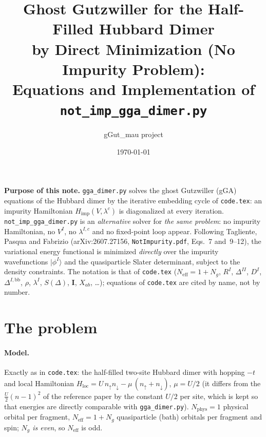 \documentclass[11pt]{article}
\title{Ghost Gutzwiller for the Half-Filled Hubbard Dimer\\
by Direct Minimization (No Impurity Problem):\\
Equations and Implementation of \texttt{not\_imp\_gga\_dimer.py}}
\author{gGut\_mau project}
\date{\today}
\newcommand{\Neff}{N_{\mathrm{eff}}}
\newcommand{\Nphys}{N_{\mathrm{phys}}}
\newcommand{\Ng}{N_{g}}
\newcommand{\Himp}{H_{\mathrm{imp}}}
\newcommand{\Hloc}{H_{\mathrm{loc}}}
\begin{document}
\sloppy
\maketitle
\tableofcontents

\bigskip
\noindent\textbf{Purpose of this note.} \texttt{gga\_dimer.py} solves the ghost
Gutzwiller (gGA) equations of the Hubbard dimer by the iterative embedding cycle of
\texttt{code.tex}: an impurity Hamiltonian $\Himp(V,\lambda^{c})$ is diagonalized at
every iteration. \texttt{not\_imp\_gga\_dimer.py} is an \emph{alternative} solver for
\emph{the same problem}: no impurity Hamiltonian, no $V^I$, no $\lambda^{I,c}$ and no
fixed-point loop appear. Following Tagliente, Pasqua and Fabrizio
(arXiv:2607.27156, \texttt{NotImpurity.pdf}, Eqs.~7 and~9--12), the variational energy
functional is minimized \emph{directly} over the impurity wavefunctions
$|\phi^I\rangle$ and the quasiparticle Slater determinant, subject to the density
constraints. The notation is that of \texttt{code.tex} ($\Neff=1+\Ng$, $R^I$, $\Delta^{II}$,
$D^I$, $\Delta^{I,\mathrm{bb}}$, $\rho$, $\lambda^I$, $S(\Delta)$, $\mathbf I$, $X_{ab}$,
\dots); equations of \texttt{code.tex} are cited by name, not by number.

\section{The problem}
\label{sec:problem}

\paragraph{Model.} Exactly as in \texttt{code.tex}: the half-filled two-site Hubbard
dimer with hopping $-t$ and local Hamiltonian
$\Hloc = U\,n_{\uparrow}n_{\downarrow}-\mu\,(n_{\uparrow}+n_{\downarrow})$, $\mu=U/2$
(it differs from the $\tfrac U2(n-1)^2$ of the reference paper by the constant $U/2$
per site, which is kept so that energies are directly comparable with
\texttt{gga\_dimer.py}). $\Nphys=1$ physical orbital per fragment, $\Neff=1+\Ng$
quasiparticle (bath) orbitals per fragment and spin; \emph{$\Ng$ is even}, so $\Neff$ is odd.
\end{document}
